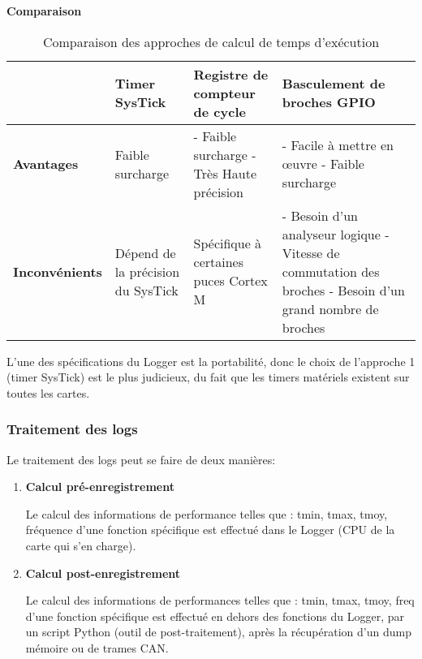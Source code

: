 \documentclass[a4paper, 12pt]{report}
\begin{document}
\textbf{Comparaison}
        \begin{table}[H]
            \begin{center}
                
            \begin{tabularx}{\textwidth} { 
              | >{\centering\arraybackslash}X 
              | >{\centering\arraybackslash}X 
              | >{\centering\arraybackslash}X 
              | >{\centering\arraybackslash}X | }
             \hline
              & \textbf{Timer SysTick} & \textbf{Registre de compteur de cycle} & \textbf{Basculement de broches GPIO } \\
             \hline
            \textbf{Avantages}  & Faible surcharge &

- Faible surcharge \newline
- Très Haute précision  & - Facile à mettre en œuvre\newline
- Faible surcharge \\
            \hline
            \textbf{Inconvénients} & Dépend de la précision du SysTick & Spécifique à certaines puces Cortex M & - Besoin d'un analyseur logique \newline
- Vitesse de commutation des broches \newline
- Besoin d'un grand nombre de broches
  \\
  \hline

            \end{tabularx}
            \caption{Comparaison des approches de calcul de temps d'exécution}
            \label{tab:lvrbl2-tempsExec}
            \end{center}
            \end{table}

L'une des spécifications du Logger est la portabilité, donc le choix de l'approche 1 (timer SysTick) est le plus judicieux, du fait que les timers matériels existent sur toutes les cartes. 

\subsubsection{Traitement des logs}
Le traitement des logs peut se faire de deux manières:
\begin{enumerate}
    
\item \textbf{Calcul pré-enregistrement} 

Le calcul des informations de performance telles que : tmin, tmax, tmoy, fréquence d'une fonction spécifique est effectué dans le Logger (CPU de la carte qui s'en charge).


\item \textbf{Calcul post-enregistrement}

Le calcul des informations de performances telles que : tmin, tmax, tmoy, freq d'une fonction spécifique est effectué en dehors des fonctions du Logger, par un script Python (outil de post-traitement), après la récupération d'un dump mémoire ou de trames CAN.


\end{enumerate}
\end{document}

